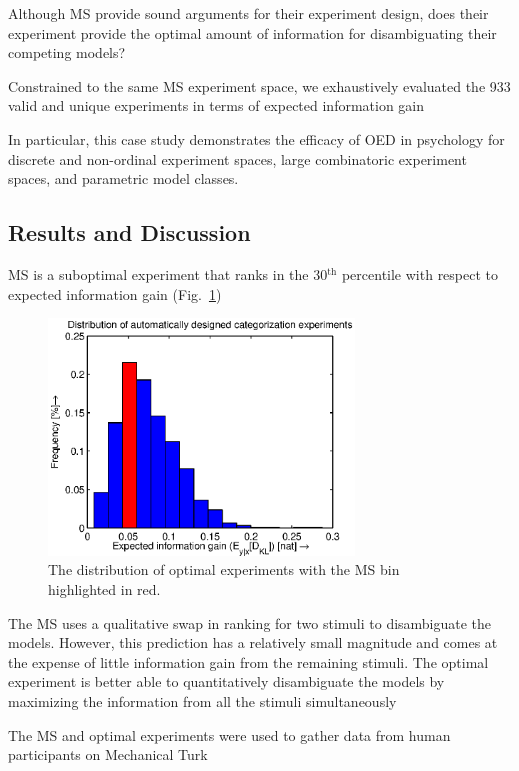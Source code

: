\documentclass{article}
\begin{document}
Although MS provide sound arguments for their experiment design, does their experiment provide the optimal amount of information for disambiguating their competing models?

Constrained to the same MS experiment space, we exhaustively evaluated the 933 valid and unique experiments in terms of expected information gain

In particular, this case study demonstrates the efficacy of OED in psychology for discrete and non-ordinal experiment spaces, large combinatoric experiment spaces, and parametric model classes. 

\subsection{Results and Discussion}

MS is a suboptimal experiment that ranks in the 30$^\text{th}$ percentile with respect to expected information gain (Fig.~\ref{fig:dist})
\begin{figure}[h!]
\centering
\includegraphics[width=3.2in]{img/dist.eps}
\caption{The distribution of optimal experiments with the MS bin highlighted in red.}
\label{fig:dist}
\end{figure}

The MS uses a qualitative swap in ranking for two stimuli to disambiguate the models. However, this prediction has a relatively small magnitude and comes at the expense of little information gain from the remaining stimuli. The optimal experiment is better able to quantitatively disambiguate the models by maximizing the information from all the stimuli simultaneously

The MS and optimal experiments were used to gather data from human participants on Mechanical Turk
\end{document}
